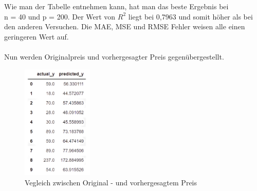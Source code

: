 \documentclass[12pt]{article}
\begin{document}
\begin{text}
Wie man der Tabelle entnehmen kann, hat man das beste Ergebnis bei \\ n = 40 und p = 200. Der Wert von $R^2$ liegt bei 0,7963 und somit höher als bei den anderen Versuchen. Die MAE, MSE und RMSE Fehler weisen alle einen geringeren Wert auf.
\\\\
Nun werden Originalpreis und vorhergesagter Preis gegenübergestellt.

\begin{figure}[h]
 \includegraphics[width=0.3\textwidth]{vergleichpreis.png}
 \caption{Vegleich zwischen Original - und vorhergesagtem Preis}
\end{figure}



\end{text}
\end{document}
